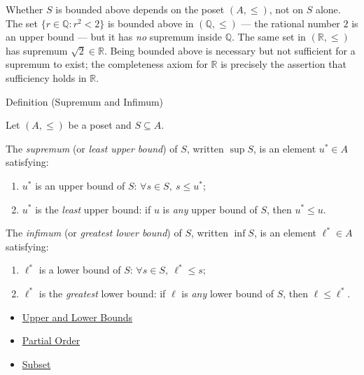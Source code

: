 \begin{remark*}
\label{rem:bounds-ambient}
Whether $S$ is bounded above depends on the poset $(A, \leq)$, not on
$S$ alone.  The set $\{r \in \mathbb{Q} : r^2 < 2\}$ is bounded above in
$(\mathbb{Q}, \leq)$ — the rational number $2$ is an upper bound — but
it has \emph{no} supremum inside $\mathbb{Q}$.  The same set in
$(\mathbb{R}, \leq)$ has supremum $\sqrt{2} \in \mathbb{R}$.  Being
bounded above is necessary but not sufficient for a supremum to exist;
the completeness axiom for $\mathbb{R}$ is precisely the assertion that
sufficiency holds in $\mathbb{R}$.
\end{remark*}


\begin{definitionbox}{Definition (Supremum and Infimum)}
\begin{definition}\label{def:sup-inf}
Let $(A, \leq)$ be a poset and $S \subseteq A$.

The \emph{supremum} (or \emph{least upper bound}) of $S$, written
$\sup S$, is an element $u^* \in A$ satisfying:
\begin{enumerate}[label=(\roman*)]
  \item $u^*$ is an upper bound of $S$: $\forall s \in S,\ s \leq u^*$;
  \item $u^*$ is the \emph{least} upper bound: if $u$ is \emph{any}
        upper bound of $S$, then $u^* \leq u$.
\end{enumerate}

The \emph{infimum} (or \emph{greatest lower bound}) of $S$, written
$\inf S$, is an element $\ell^* \in A$ satisfying:
\begin{enumerate}[label=(\roman*)]
  \item $\ell^*$ is a lower bound of $S$: $\forall s \in S,\ \ell^* \leq s$;
  \item $\ell^*$ is the \emph{greatest} lower bound: if $\ell$ is \emph{any}
        lower bound of $S$, then $\ell \leq \ell^*$.
\end{enumerate}
\end{definition}
\end{definitionbox}

\begin{dependencies}
\begin{itemize}
  \item \hyperref[def:bounds]{Upper and Lower Bounds}
  \item \hyperref[def:partial-order]{Partial Order}
  \item \hyperref[def:subset]{Subset}
\end{itemize}
\end{dependencies}

